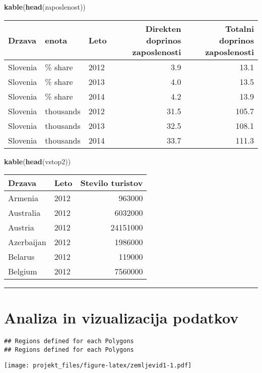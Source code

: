 \documentclass[]{article}
\newenvironment{Shaded}{\begin{snugshade}}{\end{snugshade}}
\newcommand{\KeywordTok}[1]{\textcolor[rgb]{0.13,0.29,0.53}{\textbf{{#1}}}}
\newcommand{\NormalTok}[1]{{#1}}
\begin{document}
\begin{Shaded}
\begin{Highlighting}[]
\KeywordTok{kable}\NormalTok{(}\KeywordTok{head}\NormalTok{(zaposlenost))}
\end{Highlighting}
\end{Shaded}

\begin{longtable}[c]{@{}lllrr@{}}
\toprule
Drzava & enota & Leto & Direkten doprinos zaposlenosti & Totalni
doprinos zaposlenosti\tabularnewline
\midrule
\endhead
Slovenia & \% share & 2012 & 3.9 & 13.1\tabularnewline
Slovenia & \% share & 2013 & 4.0 & 13.5\tabularnewline
Slovenia & \% share & 2014 & 4.2 & 13.9\tabularnewline
Slovenia & thousands & 2012 & 31.5 & 105.7\tabularnewline
Slovenia & thousands & 2013 & 32.5 & 108.1\tabularnewline
Slovenia & thousands & 2014 & 33.7 & 111.3\tabularnewline
\bottomrule
\end{longtable}

\begin{Shaded}
\begin{Highlighting}[]
\KeywordTok{kable}\NormalTok{(}\KeywordTok{head}\NormalTok{(vstop2))}
\end{Highlighting}
\end{Shaded}

\begin{longtable}[c]{@{}llr@{}}
\toprule
Drzava & Leto & Stevilo turistov\tabularnewline
\midrule
\endhead
Armenia & 2012 & 963000\tabularnewline
Australia & 2012 & 6032000\tabularnewline
Austria & 2012 & 24151000\tabularnewline
Azerbaijan & 2012 & 1986000\tabularnewline
Belarus & 2012 & 119000\tabularnewline
Belgium & 2012 & 7560000\tabularnewline
\bottomrule
\end{longtable}

\begin{center}\rule{0.5\linewidth}{\linethickness}\end{center}

\section{Analiza in vizualizacija
podatkov}\label{analiza-in-vizualizacija-podatkov}

\begin{verbatim}
## Regions defined for each Polygons
## Regions defined for each Polygons
\end{verbatim}

\texttt{[image: projekt\_files/figure-latex/zemljevid1-1.pdf]}
\end{document}
